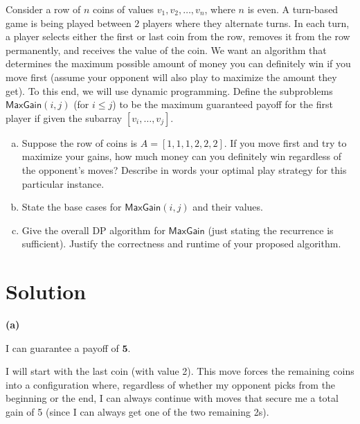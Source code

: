 \documentclass[11pt]{article}
\begin{document}
    \begin{tcolorbox}[title={Problem 3 (The Coin Game, 35 points)}] \setlength\parindent{1em}
        
    Consider a row of $n$ coins of values $v_1, v_2, \dots, v_n$, where $n$ is even. A turn-based game is being played between
    $2$ players where they alternate turns. In each turn, a player selects either the first or last coin from the
    row, removes it from the row permanently, and receives the value of the coin. We want an algorithm that
    determines the maximum possible amount of money you can definitely win if you move first (assume your
    opponent will also play to maximize the amount they get). To this end, we will use dynamic programming.
    Define the subproblems $\mathsf{MaxGain}(i, j)$ (for $i \leq j$) to be the maximum guaranteed payoff for the first player if given the subarray $[v_i,  \dots, v_j]$.
    \begin{enumerate}[(a)]
    \item Suppose the row of coins is $A=[1,1,1,2,2,2]$. If you move first and try to maximize your gains, how much money can you definitely win regardless
    of the opponent’s moves? Describe in words your optimal play strategy for this particular instance.
    \item State the base cases for $\mathsf{MaxGain}(i, j)$ and their values.
    \item Give the overall DP algorithm for  $\mathsf{MaxGain}$ (just stating the recurrence is sufficient). Justify the correctness and runtime of your proposed algorithm.

    \end{enumerate}
    \end{tcolorbox}
    
    \section*{Solution}
        \textbf{(a)}
        
        I can guarantee a payoff of \(\mathbf{5}\). 
        
        I will start with the last coin (with value 2). This move forces the remaining coins into a configuration where, regardless of whether my opponent picks from the beginning or the end, I can
        always continue with moves that secure me a total gain of 5 (since I can always get one of the two remaining 2s).
        \bigskip
        
\end{document}
